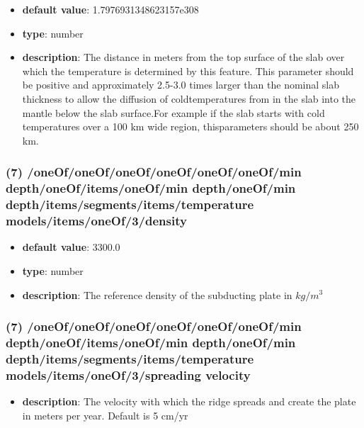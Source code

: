 \begin{itemize}[leftmargin=7em]\item {\bf default value}: 1.7976931348623157e308
\item {\bf type}: number
\item {\bf description}: The distance in meters from the top surface of the slab over which the temperature is determined by this feature. This parameter should be positive and approximately 2.5-3.0 times larger than the nominal slab thickness to allow the diffusion of coldtemperatures from in the slab into the mantle below the slab surface.For example if the slab starts with cold temperatures over a 100 km wide region, thisparameters should be about 250 km.
\end{itemize}\subsubsection{(7) /oneOf/oneOf/oneOf/oneOf/oneOf/oneOf/min depth/oneOf/items/oneOf/min depth/oneOf/min depth/items/segments/items/temperature models/items/oneOf/3/density}
\begin{itemize}[leftmargin=7em]\item {\bf default value}: 3300.0
\item {\bf type}: number
\item {\bf description}: The reference density of the subducting plate in $kg/m^3$
\end{itemize}\subsubsection{(7) /oneOf/oneOf/oneOf/oneOf/oneOf/oneOf/min depth/oneOf/items/oneOf/min depth/oneOf/min depth/items/segments/items/temperature models/items/oneOf/3/spreading velocity}
\begin{itemize}[leftmargin=7em]\item {\bf description}: The velocity with which the ridge spreads and create the plate in meters per year. Default is 5 cm/yr
\end{itemize}
